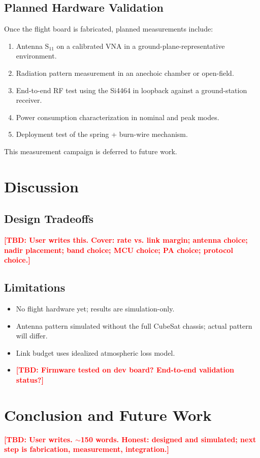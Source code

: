 \documentclass[conference]{IEEEtran}
\newcommand{\tbd}[1]{\textcolor{red}{\textbf{[TBD: #1]}}}
\begin{document}
\subsection{Planned Hardware Validation}
Once the flight board is fabricated, planned measurements include:
\begin{enumerate}
\item Antenna S$_{11}$ on a calibrated VNA in a ground-plane-representative environment.
\item Radiation pattern measurement in an anechoic chamber or open-field.
\item End-to-end RF test using the Si4464 in loopback against a ground-station receiver.
\item Power consumption characterization in nominal and peak modes.
\item Deployment test of the spring + burn-wire mechanism.
\end{enumerate}
This measurement campaign is deferred to future work.

\section{Discussion}

\subsection{Design Tradeoffs}
\tbd{User writes this. Cover: rate vs. link margin; antenna choice; nadir placement; band choice; MCU choice; PA choice; protocol choice.}

\subsection{Limitations}
\begin{itemize}
\item No flight hardware yet; results are simulation-only.
\item Antenna pattern simulated without the full CubeSat chassis; actual pattern will differ.
\item Link budget uses idealized atmospheric loss model.
\item \tbd{Firmware tested on dev board? End-to-end validation status?}
\end{itemize}

\section{Conclusion and Future Work}
\tbd{User writes. $\sim$150 words. Honest: designed and simulated; next step is fabrication, measurement, integration.}
\end{document}
